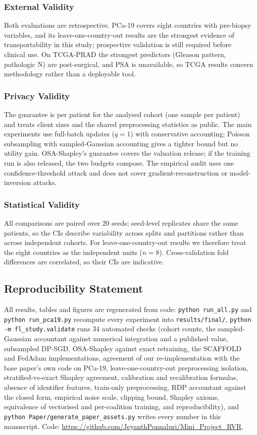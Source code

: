 \documentclass[journal]{IEEEtran}
\begin{document}
\subsubsection{External Validity}
Both evaluations are retrospective. PCa-19 covers eight countries with pre-biopsy variables, and its leave-one-country-out results are the strongest evidence of transportability in this study; prospective validation is still required before clinical use. On TCGA-PRAD the strongest predictors (Gleason pattern, pathologic N) are post-surgical, and PSA is unavailable, so TCGA results concern methodology rather than a deployable tool.

\subsubsection{Privacy Validity}
The guarantee is per patient for the analysed cohort (one sample per patient) and treats client sizes and the shared preprocessing statistics as public. The main experiments use full-batch updates ($q=1$) with conservative accounting; Poisson subsampling with sampled-Gaussian accounting gives a tighter bound but no utility gain. OSA-Shapley's guarantee covers the valuation release; if the training run is also released, the two budgets compose. The empirical audit uses one confidence-threshold attack and does not cover gradient-reconstruction or model-inversion attacks.

\subsubsection{Statistical Validity}
All comparisons are paired over 20 seeds; seed-level replicates share the same patients, so the CIs describe variability across splits and partitions rather than across independent cohorts. For leave-one-country-out results we therefore treat the eight countries as the independent units ($n=8$). Cross-validation fold differences are correlated, so their CIs are indicative.

\subsection{Reproducibility Statement}
All results, tables and figures are regenerated from code: \texttt{python run\_all.py} and \texttt{python run\_pca19.py} recompute every experiment into \texttt{results/final/}, \texttt{python -m fl\_study.validate} runs 34 automated checks (cohort counts, the sampled-Gaussian accountant against numerical integration and a published value, subsampled DP-SGD, OSA-Shapley against exact retraining, the SCAFFOLD and FedAdam implementations, agreement of our re-implementation with the base paper's own code on PCa-19, leave-one-country-out preprocessing isolation, stratified-vs-exact Shapley agreement, calibration and recalibration formulas, absence of identifier features, train-only preprocessing, RDP accountant against the closed form, empirical noise scale, clipping bound, Shapley axioms, equivalence of vectorised and per-coalition training, and reproducibility), and \texttt{python Paper/generate\_paper\_assets.py} writes every number in this manuscript. Code: \url{https://github.com/JeyanthPonnaluri/Mini_Project_RVR}.
\end{document}
